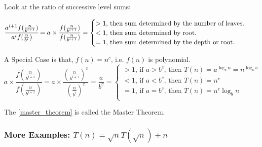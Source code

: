 Look at the ratio of successive level sums:

\begin{equation}
    \cfrac{a^{i+1}f(\frac{n}{b^{i+1}})}{a^if(\frac{n}{b^i})}
    = a \times \frac{f(\frac{n}{b^{i+1}})}{f(\frac{n}{b^{i+1}})}
    =
    \begin{cases}
        > 1 \text{, then sum determined by the number of leaves.}\\
        < 1 \text{, then sum determined by root.} \\
        = 1 \text{, then sum determined by the depth or root.}\\
    \end{cases}
\end{equation}

A Special Case is that, $f(n) = n^c$, i.e. $f(n)$ is polynomial.
\begin{equation}\label{master_theorem}
    a \times \frac{f(\frac{n}{b^{i+1}})}{f(\frac{n}{b^{i+1}})}
    = a \times \frac{(\frac{n}{b^{i+1}})^c}{(\frac{n}{b^i})^c}
    = \frac{a}{b^c}
    =
    \begin{cases}
        > 1\text{, if } a>b^c\text{, then } T(n) = a^{\log_b n} = n^{\log_b a}\\
        < 1\text{, if } a<b^c\text{, then } T(n) = n^c\\
        = 1\text{, if } a=b^c\text{, then } T(n) = n^c\log_b n \\
    \end{cases}
\end{equation}

The \cref{master_theorem} is called the Master Theorem.

\subsubsection{More Examples: \texorpdfstring{$T(n)=\sqrt{n}T(\sqrt{n})+n$}{T(n)=sqrt(n)T(sqrt(n))+n}}

